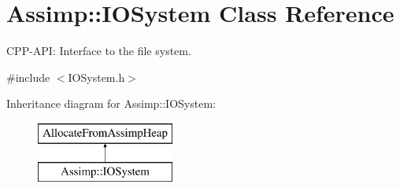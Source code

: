 \hypertarget{class_assimp_1_1_i_o_system}{\section{Assimp\-:\-:I\-O\-System Class Reference}
\label{class_assimp_1_1_i_o_system}
}


C\-P\-P-\/\-A\-P\-I\-: Interface to the file system.  




{\ttfamily \#include $<$I\-O\-System.\-h$>$}

Inheritance diagram for Assimp\-:\-:I\-O\-System\-:\begin{figure}[H]
\begin{center}
\leavevmode
\includegraphics[height=2.000000cm]{class_assimp_1_1_i_o_system}
\end{center}
\end{figure}

